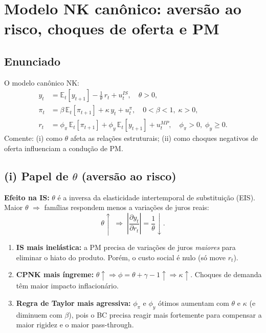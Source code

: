 \documentclass[12pt, a4paper]{article}
\newcommand{\E}{\mathbb{E}}
\begin{document}
\bigskip

\section{Modelo NK canônico: aversão ao risco, choques de oferta e PM}

\subsection*{Enunciado}
O modelo canônico NK:
\begin{align}
y_t &= \E_t[y_{t+1}] - \frac{1}{\theta}\,r_t + u_t^{IS},\quad \theta > 0, \\
\pi_t &= \beta\,\E_t[\pi_{t+1}] + \kappa\,y_t + u_t^{\pi},\quad 0<\beta<1,\;\kappa>0, \\
r_t &= \phi_\pi\,\E_t[\pi_{t+1}] + \phi_y\,\E_t[y_{t+1}] + u_t^{MP},\quad \phi_\pi>0,\;\phi_y\geq 0.
\end{align}
Comente: (i) como $\theta$ afeta as relações estruturais; (ii) como choques negativos
de oferta influenciam a condução de PM.

\subsection*{(i) Papel de $\theta$ (aversão ao risco)}

\textbf{Efeito na IS:} $\theta$ é a inversa da elasticidade intertemporal de substituição
(EIS). Maior $\theta$ $\Rightarrow$ famílias respondem menos a variações de juros reais:
\[
\theta \uparrow \;\Rightarrow\; \left|\frac{\partial y_t}{\partial r_t}\right| = \frac{1}{\theta} \downarrow.
\]

\begin{resultbox}[title={Efeitos de $\theta$ no sistema NK}]
\begin{enumerate}[leftmargin=1.5em, itemsep=3pt]
  \item \textbf{IS mais inelástica:} a PM precisa de variações de juros \emph{maiores}
    para eliminar o hiato do produto. Porém, o custo social é nulo (só move $r_t$).
  \item \textbf{CPNK mais íngreme:} $\theta \uparrow \Rightarrow \phi = \theta+\gamma-1 \uparrow
    \Rightarrow \kappa \uparrow$. Choques de demanda têm maior impacto inflacionário.
  \item \textbf{Regra de Taylor mais agressiva:} $\phi_\pi$ e $\phi_y$ ótimos aumentam
    com $\theta$ e $\kappa$ (e diminuem com $\beta$), pois o BC precisa reagir mais
    fortemente para compensar a maior rigidez e o maior pass-through.
\end{enumerate}
\end{resultbox}
\end{document}

